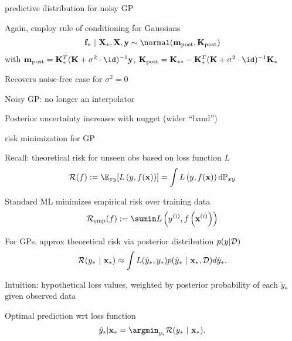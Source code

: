 \documentclass[11pt,compress,t,notes=noshow, xcolor=table]{beamer}
\begin{document}
\begin{framei}[sep=M]{predictive distribution for noisy GP}
\item Again, employ rule of conditioning for Gaussians 
\begin{eqnarray*}
\fv_* ~|~ \Xmat_*, \Xmat, \yv \sim \normal(\mv_{\text{post}}, \Kmat_\text{post})
\end{eqnarray*}
with 
$\mv_{\text{post}} = \Kmat_{*}^{T} (\Kmat+ \sigma^2 \cdot \id)^{-1}\yv$, 
$\Kmat_\text{post} = \Kmat_{**} - \Kmat_*^T (\Kmat  + \sigma^2 \cdot \id)^{-1}\Kmat_*$
\item Recovers noise-free case for $\sigma^2 = 0$
\item Noisy GP: no longer an interpolator 
\item Posterior uncertainty increases with nugget (wider ``band'')
\vfill
{}
\end{framei}

\begin{framei}[sep=M]{risk minimization for GP}
\item Recall: theoretical risk for unseen obs based on loss function $L$
$$\riskf := \E_{xy} [\Lxy] = \int \Lxy \text{d}\Pxy$$ 
\item Standard ML minimizes empirical risk over training data $$\riske(f) := \sumin \Lxyi$$ 
\item For GPs, approx theoretical risk via posterior distribution $p(y | \mathcal{D})$
$$
    \mathcal{R}(y_* ~|~ \mathbf{x}_*) \approx \int L(\tilde y_*, y_*) p(\tilde y_*~|~\mathbf{x}_*, \mathcal{D})d\tilde y_*. 
  $$
\item Intuition: hypothetical loss values, weighted by posterior probability of  each $\tilde y_*$ given observed data
\item Optimal prediction wrt loss function
$$
    \yh_* | \xv_* = \argmin_{y_*} \mathcal{R}(y_*~|~ \xv_*).
  $$
\end{framei}





\end{document}
